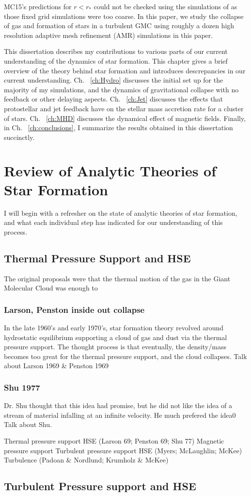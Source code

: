 \documentclass[../dissertation.tex]{subfiles}
\begin{document}
MC15's predictions for $r<r_*$ could not be checked using the simulations
of \citet{2015ApJ...800...49L} as those fixed grid simulations were
too coarse.  In this paper, we study the collapse of gas and formation
of stars in a turbulent GMC using roughly a dozen high resolution
adaptive mesh refinement (AMR) simulations in this paper.


This dissertation describes my contributions to various parts of our current understanding of the dynamics of star formation. 
This chapter gives a brief overview of the theory behind star formation and introduces descrepancies in our current understanding. 
Ch. ~\ref{ch:Hydro} discusses the initial set up for the majority of my simulations, and the dynamics of gravitational collapse with no feedback or other delaying aspects.
Ch. ~\ref{ch:Jet} discusses the effects that protostellar and jet feedback have on the stellar mass accretion rate for a cluster of stars.
Ch. ~\ref{ch:MHD} discusses the dynamical effect of magnetic fields.
Finally, in Ch. ~\ref{ch:conclusions}, I summarize the results obtained in this dissertation succinctly.

%
\section{Review of Analytic Theories of Star Formation}
\label{sec:sf_review}
I will begin with a refresher on the state of analytic theories of star formation, and what each individual step has indicated for our understanding of this process.

\subsection{Thermal Pressure Support and HSE}
The original proposals were that the thermal motion of the gas in the Giant Molecular Cloud was enough to

\subsubsection{Larson, Penston inside out collapse}
In the late 1960's and early 1970's, star formation theory revolved around hydrostatic equilibrium supporting a cloud of gas and dust via the thermal pressure support. The thought process is that eventually, the density/mass becomes too great for the thermal pressure support, and the cloud collapses.
Talk about Larson 1969 \& Penston 1969

\subsubsection{Shu 1977}
\label{subsec:Shu_review}
Dr. Shu thought that this idea had promise, but he did not like the idea of a stream of material infalling at an infinite velocity. 
He much prefered the idea0
Talk about Shu.


Thermal pressure support HSE (Larson 69; Penston 69; Shu 77)
Magnetic pressure support
Turbulent pressure support HSE (Myers; McLaughlin; McKee)
Turbulence (Padoan \& Nordlund; Krumholz \& McKee)

\subsection{Turbulent Pressure support and HSE}
\end{document}

